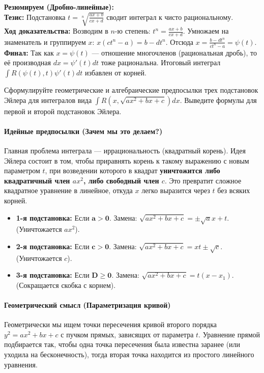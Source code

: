 \begin{tcolorbox}[colback=gray!5, colframe=black, boxrule=0.5pt, arc=0pt]
\textbf{Резюмируем (Дробно-линейные):} \\
\textbf{Тезис:} Подстановка $t = \sqrt[n]{\frac{ax+b}{cx+d}}$ сводит интеграл к чисто рациональному. \\
\textbf{Ход доказательства:} Возводим в $n$-ю степень: $t^n = \frac{ax+b}{cx+d}$. Умножаем на знаменатель и группируем $x$: $x(ct^n - a) = b - dt^n$. Отсюда $x = \frac{b - dt^n}{ct^n - a} = \psi(t)$. \\
\textbf{Финал:} Так как $x = \psi(t)$ — отношение многочленов (рациональная дробь), то её производная $dx = \psi'(t)dt$ тоже рациональна. Итоговый интеграл $\int R(\psi(t), t)\psi'(t)dt$ избавлен от корней.
\end{tcolorbox}




{Сформулируйте геометрические и алгебраические предпосылки трех подстановок Эйлера для интегралов вида $\int R(x, \sqrt{ax^2+bx+c})dx$. Выведите формулы для первой и второй подстановок Эйлера.}

\paragraph{Идейные предпосылки (Зачем мы это делаем?)}
Главная проблема интеграла — иррациональность (квадратный корень). Идея Эйлера состоит в том, чтобы приравнять корень к такому выражению с новым параметром $t$, при возведении которого в квадрат \textbf{уничтожится либо квадратичный член $ax^2$, либо свободный член $c$}. Это превратит сложное квадратное уравнение в линейное, откуда $x$ легко выразится через $t$ без всяких корней.
\begin{itemize}
    \item \textbf{1-я подстановка:} Если $\boldsymbol{a > 0}$. Замена: $\sqrt{ax^2+bx+c} = \pm \sqrt{a}x + t$. (Уничтожается $ax^2$).
    \item \textbf{2-я подстановка:} Если $\boldsymbol{c > 0}$. Замена: $\sqrt{ax^2+bx+c} = xt \pm \sqrt{c}$. (Уничтожается $c$).
    \item \textbf{3-я подстановка:} Если $\boldsymbol{D \ge 0}$. Замена: $\sqrt{ax^2+bx+c} = t(x - x_1)$. (Сокращается скобка с корнем).
\end{itemize}

\paragraph{Геометрический смысл (Параметризация кривой)}
Геометрически мы ищем точки пересечения кривой второго порядка $y^2 = ax^2+bx+c$ с пучком прямых, зависящих от параметра $t$. Уравнение прямой подбирается так, чтобы одна точка пересечения была известна заранее (или уходила на бесконечность), тогда вторая точка находится из простого линейного уравнения.

